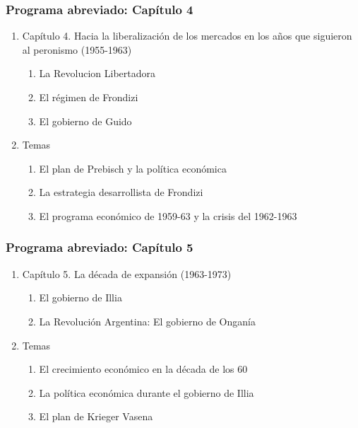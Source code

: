 \documentclass[14pt,aspectratio=169]{beamer}
\begin{document}
  
\begin{frame}\frametitle{Programa abreviado: Capítulo 4}
     \begin{enumerate}
     \item Capítulo 4. Hacia la liberalización de los mercados en los
       años que siguieron al peronismo (1955-1963)
       \begin{enumerate}
       \item La Revolucion Libertadora
       \item El régimen de Frondizi
         \item El gobierno de Guido
       \end{enumerate}
     \item Temas
       \begin{enumerate}
       \item El plan de Prebisch y la política económica
       \item La estrategia desarrollista de Frondizi
         \item El programa económico de 1959-63 y la crisis del 1962-1963
         \end{enumerate}
         \end{enumerate}
  \end{frame}


  \begin{frame}\frametitle{Programa abreviado: Capítulo 5}
     \begin{enumerate}
     \item Capítulo 5. La década de expansión (1963-1973)
       \begin{enumerate}
       \item El gobierno de Illia
       \item La Revolución Argentina: El gobierno de Onganía
      \end{enumerate}
     \item Temas
       \begin{enumerate}
       \item El crecimiento económico en la década de los 60
       \item La política económica durante el gobierno de Illia
         \item El plan de Krieger Vasena
         \end{enumerate}
         \end{enumerate}
  \end{frame}
  
\end{document}
